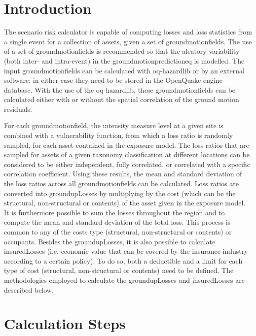 

\section{Introduction}
The scenario risk calculator is capable of computing losses and loss statistics from a single event for a collection of assets, given a set of \glspl{groundmotionfield}. The use of a set of \glspl{groundmotionfield} is recommended so that the aleatory variability (both inter- and intra-event) in the \gls{groundmotionpredictioneq} is modelled. The input \glspl{groundmotionfield} can be calculated with oq-hazardlib or by an external software; in either case they need to be stored in the OpenQuake engine database. With the use of the oq-hazardlib, these \glspl{groundmotionfield} can be calculated either with or without the spatial correlation of the ground motion residuals.

For each \gls{groundmotionfield}, the intensity measure level at a given site is combined with a \gls{vulnerability function}, from which a loss ratio is randomly sampled, for each \gls{asset} contained in the \gls{exposure model}. The loss ratios that are sampled for \glspl{asset} of a given \gls{taxonomy} classification at different locations can be considered to be either independent, fully correlated, or correlated with a specific correlation coefficient. Using these results, the mean and standard deviation of the loss ratios across all \glspl{groundmotionfield} can be calculated. Loss ratios are converted into \gls{groundupLosses} by multiplying by the cost (which can be the structural, non-structural or contents) of the \gls{asset} given in the exposure model. It is furthermore possible to sum the losses throughout the region and to compute the mean and standard deviation of the total loss. This process is common to any of the costs type (structural, non-structural or contents) or occupants.
Besides the \gls{groundupLosses}, it is also possible to calculate \gls{insuredLosses} (i.e. economic value that can be covered by the insurance industry according to a certain policy). To do so, both a \gls{deductible} and a \gls{limit} for each type of cost (structural, non-structural or contents) need to be defined. The methodologies employed to calculate the \gls{groundupLosses} and \gls{insuredLosses} are described below.

\section{Calculation Steps}

